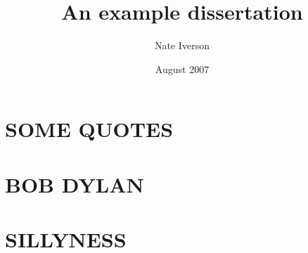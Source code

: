 \documentclass{BGSU}
\title{An example dissertation}
\author{Nate Iverson}
\date{August 2007}
\numberwithin{equation}{chapter}
\begin{document}
\frontmatter %

\maketitle

\copyrightpage %

\begin{abstract}

\end{abstract}

\begin{dedication}

\end{dedication}

\begin{acknowledgments}

\end{acknowledgments}

\tableofcontents

\listoffigures
\pagebreak
\listoftables

\begin{preface}

\end{preface}

\mainmatter %

\chapter{\texorpdfstring{SOME QUOTES}{}} %


\chapter{\texorpdfstring{BOB DYLAN}{}} %


\chapter{\texorpdfstring{SILLYNESS}{}} %

\end{document}
